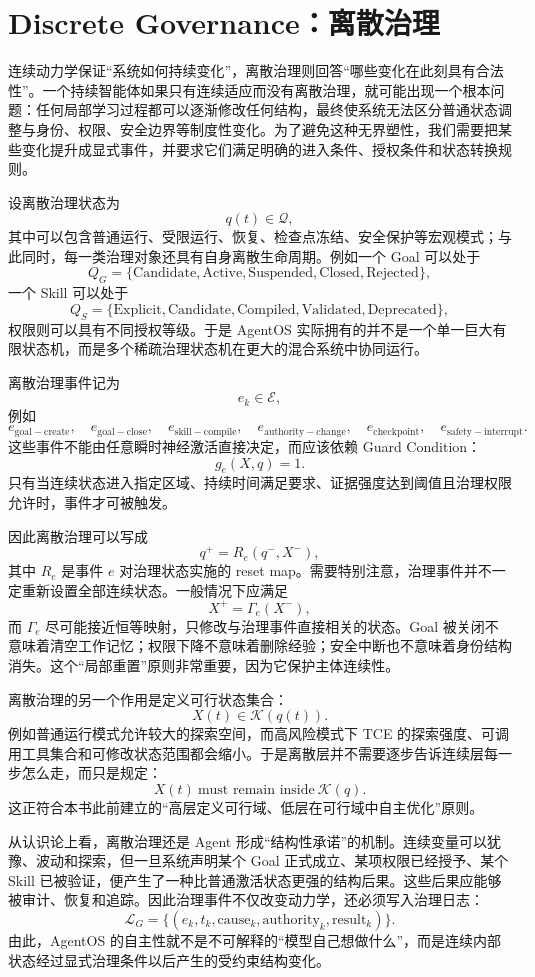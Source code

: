 \section{Discrete Governance：离散治理}

连续动力学保证“系统如何持续变化”，离散治理则回答“哪些变化在此刻具有合法性”。一个持续智能体如果只有连续适应而没有离散治理，就可能出现一个根本问题：任何局部学习过程都可以逐渐修改任何结构，最终使系统无法区分普通状态调整与身份、权限、安全边界等制度性变化。为了避免这种无界塑性，我们需要把某些变化提升成显式事件，并要求它们满足明确的进入条件、授权条件和状态转换规则。

设离散治理状态为
\[
q(t)\in\mathcal Q,
\]
其中可以包含普通运行、受限运行、恢复、检查点冻结、安全保护等宏观模式；与此同时，每一类治理对象还具有自身离散生命周期。例如一个 Goal 可以处于
\[
Q_G
=
\{
\mathrm{Candidate},
\mathrm{Active},
\mathrm{Suspended},
\mathrm{Closed},
\mathrm{Rejected}
\},
\]
一个 Skill 可以处于
\[
Q_S
=
\{
\mathrm{Explicit},
\mathrm{Candidate},
\mathrm{Compiled},
\mathrm{Validated},
\mathrm{Deprecated}
\},
\]
权限则可以具有不同授权等级。于是 AgentOS 实际拥有的并不是一个单一巨大有限状态机，而是多个稀疏治理状态机在更大的混合系统中协同运行。

离散治理事件记为
\[
e_k\in\mathcal E,
\]
例如
\[
e_{\mathrm{goal-create}},
\quad
e_{\mathrm{goal-close}},
\quad
e_{\mathrm{skill-compile}},
\quad
e_{\mathrm{authority-change}},
\quad
e_{\mathrm{checkpoint}},
\quad
e_{\mathrm{safety-interrupt}}.
\]
这些事件不能由任意瞬时神经激活直接决定，而应该依赖 Guard Condition：
\[
g_e(X,q)=1.
\]
只有当连续状态进入指定区域、持续时间满足要求、证据强度达到阈值且治理权限允许时，事件才可被触发。

因此离散治理可以写成
\[
q^{+}
=
R_e(q^{-},X^{-}),
\]
其中 \(R_e\) 是事件 \(e\) 对治理状态实施的 reset map。需要特别注意，治理事件并不一定重新设置全部连续状态。一般情况下应满足
\[
X^{+}
=
\Gamma_e(X^{-}),
\]
而 \(\Gamma_e\) 尽可能接近恒等映射，只修改与治理事件直接相关的状态。Goal 被关闭不意味着清空工作记忆；权限下降不意味着删除经验；安全中断也不意味着身份结构消失。这个“局部重置”原则非常重要，因为它保护主体连续性。

离散治理的另一个作用是定义可行状态集合：
\[
X(t)\in\mathcal K(q(t)).
\]
例如普通运行模式允许较大的探索空间，而高风险模式下 TCE 的探索强度、可调用工具集合和可修改状态范围都会缩小。于是离散层并不需要逐步告诉连续层每一步怎么走，而只是规定：
\[
\boxed{
X(t)\ \text{must remain inside}\ \mathcal K(q).
}
\]
这正符合本书此前建立的“高层定义可行域、低层在可行域中自主优化”原则。

从认识论上看，离散治理还是 Agent 形成“结构性承诺”的机制。连续变量可以犹豫、波动和探索，但一旦系统声明某个 Goal 正式成立、某项权限已经授予、某个 Skill 已被验证，便产生了一种比普通激活状态更强的结构后果。这些后果应能够被审计、恢复和追踪。因此治理事件不仅改变动力学，还必须写入治理日志：
\[
\mathcal L_G
=
\{
(e_k,t_k,\mathrm{cause}_k,\mathrm{authority}_k,\mathrm{result}_k)
\}.
\]
由此，AgentOS 的自主性就不是不可解释的“模型自己想做什么”，而是连续内部状态经过显式治理条件以后产生的受约束结构变化。

